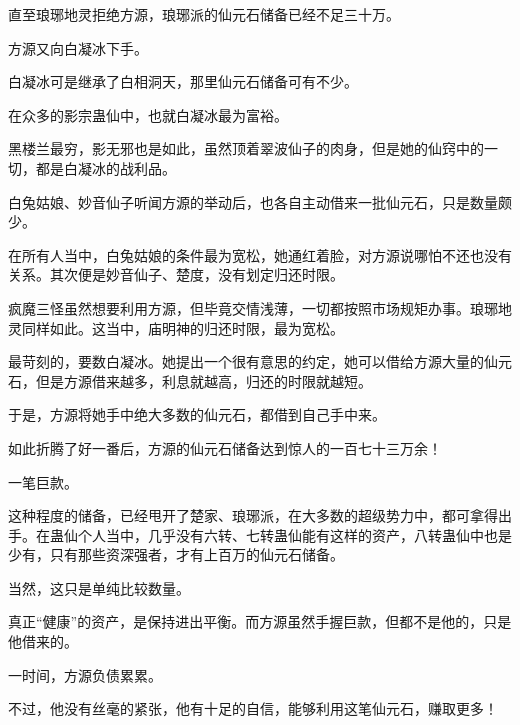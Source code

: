 \begin{this_body}
直至琅琊地灵拒绝方源，琅琊派的仙元石储备已经不足三十万。

方源又向白凝冰下手。

白凝冰可是继承了白相洞天，那里仙元石储备可有不少。

在众多的影宗蛊仙中，也就白凝冰最为富裕。

黑楼兰最穷，影无邪也是如此，虽然顶着翠波仙子的肉身，但是她的仙窍中的一切，都是白凝冰的战利品。

白兔姑娘、妙音仙子听闻方源的举动后，也各自主动借来一批仙元石，只是数量颇少。

在所有人当中，白兔姑娘的条件最为宽松，她通红着脸，对方源说哪怕不还也没有关系。其次便是妙音仙子、楚度，没有划定归还时限。

疯魔三怪虽然想要利用方源，但毕竟交情浅薄，一切都按照市场规矩办事。琅琊地灵同样如此。这当中，庙明神的归还时限，最为宽松。

最苛刻的，要数白凝冰。她提出一个很有意思的约定，她可以借给方源大量的仙元石，但是方源借来越多，利息就越高，归还的时限就越短。

于是，方源将她手中绝大多数的仙元石，都借到自己手中来。

如此折腾了好一番后，方源的仙元石储备达到惊人的一百七十三万余！

一笔巨款。

这种程度的储备，已经甩开了楚家、琅琊派，在大多数的超级势力中，都可拿得出手。在蛊仙个人当中，几乎没有六转、七转蛊仙能有这样的资产，八转蛊仙中也是少有，只有那些资深强者，才有上百万的仙元石储备。

当然，这只是单纯比较数量。

真正“健康”的资产，是保持进出平衡。而方源虽然手握巨款，但都不是他的，只是他借来的。

一时间，方源负债累累。

不过，他没有丝毫的紧张，他有十足的自信，能够利用这笔仙元石，赚取更多！

\end{this_body}

